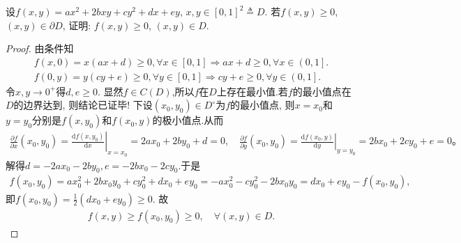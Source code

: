 \documentclass[../../main.tex]{subfiles}%
\begin{document}
\begin{example}
设$f(x,y)=ax^2+2bxy+cy^2+dx+ey$, $x,y\in[0,1]^2\triangleq D$. 若$f(x,y)\geqslant0$, $(x,y)\in\partial D$, 证明: $f(x,y)\geqslant0$, $(x,y)\in D$.
\end{example}
\begin{proof}

由条件知
\begin{gather*}
f\left( x,0 \right) =x\left( ax+d \right) \geqslant 0,\forall x\in \left[ 0,1 \right] \Longrightarrow ax+d\geqslant 0,\forall x\in \left( 0,1 \right] .
\\
f\left( 0,y \right) =y\left( cy+e \right) \geqslant 0,\forall y\in \left[ 0,1 \right] \Longrightarrow cy+e\geqslant 0,\forall y\in \left( 0,1 \right] .
\end{gather*}
令$x,y\rightarrow 0^+$得$d,e\geqslant 0$. 显然$f\in C(D)$,所以$f$在$D$上存在最小值.若$f$的最小值点在$D$的边界达到, 则结论已证毕! 下设$(x_0,y_0)\in D^\circ$为$f$的最小值点, 则$x=x_0$和$y=y_0$分别是$f(x,y_0)$和$f(x_0,y)$的极小值点.从而
\begin{align*}
\frac{\partial f}{\partial x}\left( x_0,y_0 \right) =\left.\frac{\mathrm{d}f\left( x,y_0 \right)}{\mathrm{d}x}\right|_{x=x_0}=2ax_0+2by_0+d=0,\quad \frac{\partial f}{\partial y}\left( x_0,y_0 \right) =\left.\frac{\mathrm{d}f\left( x_0,y \right)}{\mathrm{d}y}\right|_{y=y_0}=2bx_0+2cy_0+e=0。
\end{align*}
解得$d=-2ax_0-2by_0,e=-2bx_0-2cy_0$.于是
\begin{align*}
f(x_0,y_0)=ax_0^2+2bx_0y_0+cy_0^2+dx_0+ey_0=-ax_0^2-cy_0^2-2bx_0y_0=dx_0+ey_0-f(x_0,y_0),
\end{align*}
即$f(x_0,y_0)=\frac{1}{2}(dx_0+ey_0)\geqslant0$. 故
\begin{align*}
f(x,y)\geqslant f(x_0,y_0)\geqslant 0,\quad \forall (x,y)\in D.
\end{align*}
\end{proof}
\end{document}
